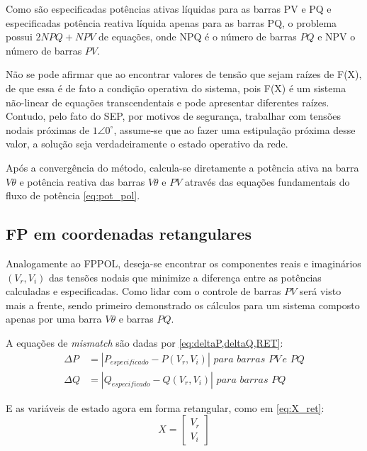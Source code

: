 Como são especificadas potências ativas líquidas para as barras PV e PQ e especificadas potência reativa líquida apenas para as barras PQ, o problema possui $2NPQ + NPV$ de equações, onde \acs{NPQ} é o número de barras $PQ$ e \acs{NPV} o número de barras $PV$.

Não se pode afirmar que ao encontrar valores de tensão que sejam raízes de F(X), de que essa é de fato a condição operativa do sistema, pois F(X) é um sistema não-linear de equações transcendentais e pode apresentar diferentes raízes. Contudo, pelo fato do \ac{SEP}, por motivos de segurança, trabalhar com tensões nodais próximas de $1 \angle 0^\circ$, assume-se que ao fazer uma estipulação próxima desse valor, a solução seja verdadeiramente o estado operativo da rede.

Após a convergência do método, calcula-se diretamente a potência ativa na barra $V \theta$ e potência reativa das barras $V \theta$ e $PV$ através das equações fundamentais do fluxo de potência \eqref{eq:pot_pol}.

\subsection{FP em coordenadas retangulares}
Analogamente ao \ac{FPPOL}, deseja-se encontrar os componentes reais e imaginários $(V_r,V_i)$  das tensões nodais 
que minimize a diferença entre as potências calculadas e especificadas. Como lidar com o controle de barras $PV$ será visto mais a frente, sendo primeiro demonstrado os cálculos para um sistema composto apenas por uma barra $V\theta$ e barras $PQ$.

A equações de \textit{mismatch} são dadas por \eqref{eq:deltaP,deltaQ,RET}:
\begin{equation}\label{eq:deltaP,deltaQ,RET}
    \begin{split}
            \Delta P &= |P_{especificado}-P(V_r, V_i)| \,\,para\,\,barras\,\,PV\,e \,\,PQ\\
            \Delta Q &= |Q_{especificado}-Q(V_r, V_i)|\,\, para\,\,barras\,\,PQ 
             \end{split}
\end{equation}

E as variáveis de estado agora em forma retangular, como em \eqref{eq:X_ret}:
\begin{equation}\label{eq:X_ret}
    X =
    \begin{bmatrix}
        V_r\\
        V_i
    \end{bmatrix}    
\end{equation}

